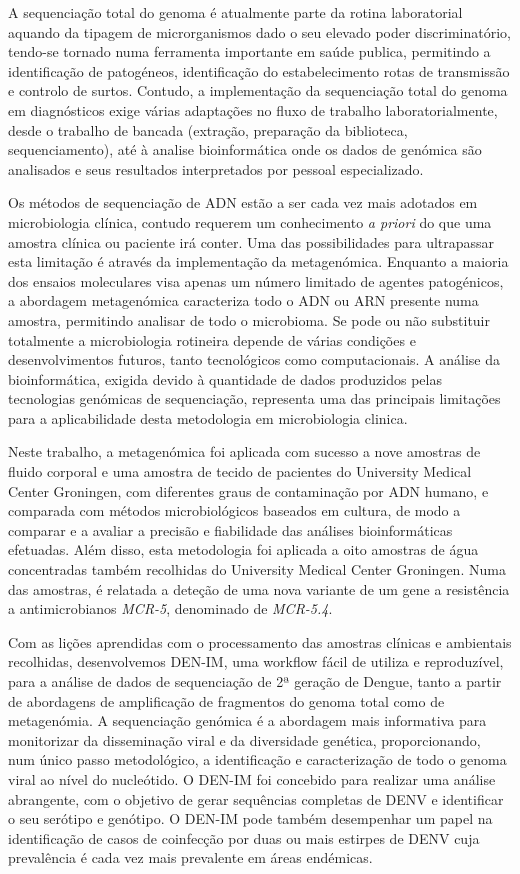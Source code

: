 A sequenciação total do genoma é atualmente parte da rotina laboratorial aquando da tipagem de microrganismos dado o seu elevado poder discriminatório, tendo-se tornado numa ferramenta importante em saúde publica, permitindo a identificação de patogéneos, identificação do estabelecimento rotas de transmissão e controlo de surtos. Contudo, a implementação da sequenciação total do genoma em diagnósticos exige várias adaptações no fluxo de trabalho laboratorialmente, desde o trabalho de bancada (extração, preparação da biblioteca, sequenciamento), até à analise bioinformática onde os dados de genómica são analisados e seus resultados interpretados por pessoal especializado.

Os métodos de sequenciação de ADN estão a ser cada vez mais adotados em microbiologia clínica, contudo requerem um conhecimento \textit{a priori} do que uma amostra clínica ou paciente irá conter. Uma das possibilidades para ultrapassar esta limitação é através da implementação da metagenómica. Enquanto a maioria dos ensaios moleculares visa apenas um número limitado de agentes patogénicos, a abordagem metagenómica caracteriza todo o ADN ou ARN presente numa amostra, permitindo analisar de todo o microbioma. Se pode ou não substituir totalmente a microbiologia rotineira depende de várias condições e desenvolvimentos futuros, tanto tecnológicos como computacionais. A análise da bioinformática, exigida devido à quantidade de dados produzidos pelas tecnologias genómicas de sequenciação, representa uma das principais limitações para a aplicabilidade desta metodologia em microbiologia clinica.

Neste trabalho, a metagenómica foi aplicada com sucesso a nove amostras de fluido corporal e uma amostra de tecido de pacientes do University Medical Center Groningen, com diferentes graus de contaminação por ADN humano, e comparada com métodos microbiológicos baseados em cultura, de modo a comparar e a avaliar a precisão e fiabilidade das análises bioinformáticas efetuadas. Além disso, esta metodologia foi aplicada a oito amostras de água concentradas também recolhidas do University Medical Center Groningen. Numa das amostras, é relatada a deteção de uma nova variante de um gene a resistência a antimicrobianos \textit{MCR-5}, denominado de \textit{MCR-5.4}.

Com as lições aprendidas com o processamento das amostras clínicas e ambientais recolhidas, desenvolvemos DEN-IM, uma workflow fácil de utiliza e reproduzível, para a análise de dados de sequenciação de 2ª geração de Dengue, tanto a partir de abordagens de amplificação de fragmentos do genoma total como de metagenómia. A sequenciação genómica é a abordagem mais informativa para monitorizar da disseminação viral e da diversidade genética, proporcionando, num único passo metodológico, a identificação e caracterização de todo o genoma viral ao nível do nucleótido. O DEN-IM foi concebido para realizar uma análise abrangente, com o objetivo de gerar sequências completas de DENV e identificar o seu serótipo e genótipo. O DEN-IM pode também desempenhar um papel na identificação de casos de coinfecção por duas ou mais estirpes de DENV cuja prevalência é cada vez mais prevalente em áreas endémicas. 

